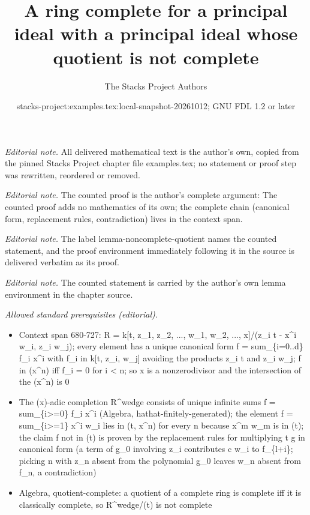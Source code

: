 \documentclass[10pt,a4paper]{amsart}
\title{A ring complete for a principal ideal with a principal ideal whose quotient is not complete}
\author{The Stacks Project Authors}
\date{stacks-project:examples.tex:local-snapshot-20261012; GNU FDL 1.2 or later}
\theoremstyle{plain}
\theoremstyle{definition}
\theoremstyle{remark}
\numberwithin{equation}{subsection}
\begin{document}
\maketitle
\noindent\textit{Editorial note.} All delivered mathematical text is the author's own, copied from the pinned Stacks Project chapter file examples.tex; no statement or proof step was rewritten, reordered or removed.\par\medskip
\noindent\textit{Editorial note.} The counted proof is the author's complete argument: The counted proof adds no mathematics of its own; the complete chain (canonical form, replacement rules, contradiction) lives in the context span.\par\medskip
\noindent\textit{Editorial note.} The label lemma-noncomplete-quotient names the counted statement, and the proof environment immediately following it in the source is delivered verbatim as its proof.\par\medskip
\noindent\textit{Editorial note.} The counted statement is carried by the author's own lemma environment in the chapter source.\par\medskip
\noindent\textit{Allowed standard prerequisites (editorial).}\begin{itemize}
\item Context span 680-727: R = k[t, z\_1, z\_2, ..., w\_1, w\_2, ..., x]/(z\_i t - x\textasciicircum{}i w\_i, z\_i w\_j); every element has a unique canonical form f = sum\_\{i=0..d\} f\_i x\textasciicircum{}i with f\_i in k[t, z\_i, w\_j] avoiding the products z\_i t and z\_i w\_j; f in (x\textasciicircum{}n) iff f\_i = 0 for i < n; so x is a nonzerodivisor and the intersection of the (x\textasciicircum{}n) is 0
\item The (x)-adic completion R\textasciicircum{}wedge consists of unique infinite sums f = sum\_\{i>=0\} f\_i x\textasciicircum{}i (Algebra, hathat-finitely-generated); the element f = sum\_\{i>=1\} x\textasciicircum{}i w\_i lies in (t, x\textasciicircum{}n) for every n because x\textasciicircum{}m w\_m is in (t); the claim f not in (t) is proven by the replacement rules for multiplying t g in canonical form (a term of g\_0 involving z\_i contributes c w\_i to f\_\{l+i\}; picking n with z\_n absent from the polynomial g\_0 leaves w\_n absent from f\_n, a contradiction)
\item Algebra, quotient-complete: a quotient of a complete ring is complete iff it is classically complete, so R\textasciicircum{}wedge/(t) is not complete
\end{itemize}\medskip
\end{document}
